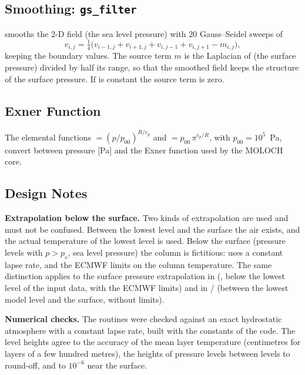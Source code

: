 \subsection{Smoothing: \texttt{gs\_filter}}
\label{subsec:hgt_gsfilter}

 smooths the 2-D field  (the sea
level pressure) with 20 Gauss--Seidel sweeps of
\[
  v_{i,j} = \tfrac14\bigl(v_{i-1,j} + v_{i+1,j} + v_{i,j-1} + v_{i,j+1}
            - m_{i,j}\bigr),
\]
keeping the boundary values. The source term $m$ is the Laplacian of
 (the surface pressure) divided by half its range, so that the
smoothed field keeps the structure of the surface pressure. If 
is constant the source term is zero.

\subsection{Exner Function}
\label{subsec:hgt_exner}

The elemental functions  $= (p/p_{00})^{R/c_p}$ and
 $= p_{00}\,\pi^{c_p/R}$, with $p_{00} = 10^5$~Pa, convert
between pressure [Pa] and the Exner function used by the MOLOCH core.

\subsection{Design Notes}
\label{subsec:hgt_design}

\textbf{Extrapolation below the surface.} Two kinds of extrapolation are
used and must not be confused. Between the lowest level and the surface
the air exists, and the actual temperature of the lowest level is used.
Below the surface (pressure levels with $p > p_s$, sea level pressure) the
column is fictitious:  uses a constant lapse rate, and
 the ECMWF limits on the column temperature. The same distinction
applies to the surface pressure extrapolation in 
(, below the lowest level of the input data, with the ECMWF
limits) and in / (between the lowest
model level and the surface, without limits).

\textbf{Numerical checks.} The routines were checked against an exact
hydrostatic atmosphere with a constant lapse rate, built with the
constants of the code. The level heights agree to the accuracy of the
mean layer temperature (centimetres for layers of a few hundred metres),
the heights of pressure levels between levels to round-off, and
 to $10^{-6}$ near the surface.

